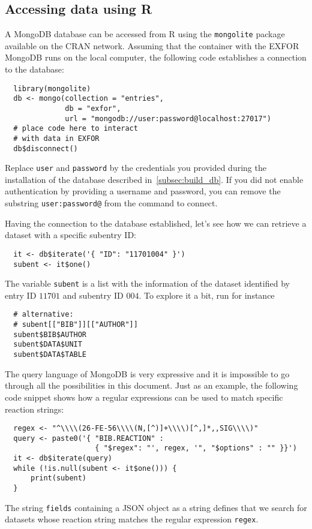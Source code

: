 \documentclass[12pt,a4paper]{scrartcl}
\begin{document}
 \subsection{Accessing data using R}
 A MongoDB database can be accessed from R using the \verb|mongolite| package available on the CRAN network.
 Assuming that the container with the EXFOR MongoDB runs on the local computer, the following code establishes a connection to the database:
\begin{verbatim}
  library(mongolite)
  db <- mongo(collection = "entries",
              db = "exfor",
              url = "mongodb://user:password@localhost:27017")
  # place code here to interact
  # with data in EXFOR
  db$disconnect()
\end{verbatim}
Replace \verb|user| and \verb|password| by the credentials you provided during the installation of the database described in~\cref{subsec:build_db}.
If you did not enable authentication by providing a username and password, you can remove the substring \verb|user:password@| from the command to connect.

Having the connection to the database established, let's see how we can retrieve a dataset with a specific subentry ID:
\begin{verbatim}
  it <- db$iterate('{ "ID": "11701004" }')
  subent <- it$one()
\end{verbatim}
The variable \verb|subent| is a list with the information of the dataset identified by entry ID $11701$ and subentry ID $004$.
To explore it a bit, run for instance
\begin{verbatim}
  # alternative:
  # subent[["BIB"]][["AUTHOR"]]
  subent$BIB$AUTHOR
  subent$DATA$UNIT
  subent$DATA$TABLE
\end{verbatim}

The query language of MongoDB is very expressive and it is impossible to go through all the possibilities in this document.
Just as an example, the following code snippet shows how a regular expressions can be used to match specific reaction strings:
\begin{verbatim}
  regex <- "^\\\\(26-FE-56\\\\(N,[^)]+\\\\)[^,]*,,SIG\\\\)" 
  query <- paste0('{ "BIB.REACTION" : 
                     { "$regex": "', regex, '", "$options" : "" }}')
  it <- db$iterate(query)
  while (!is.null(subent <- it$one())) {
      print(subent)
  }
\end{verbatim}
The string \verb|fields| containing a JSON object as a string defines that we search for datasets whose reaction string matches the regular expression \verb|regex|.
\end{document}
